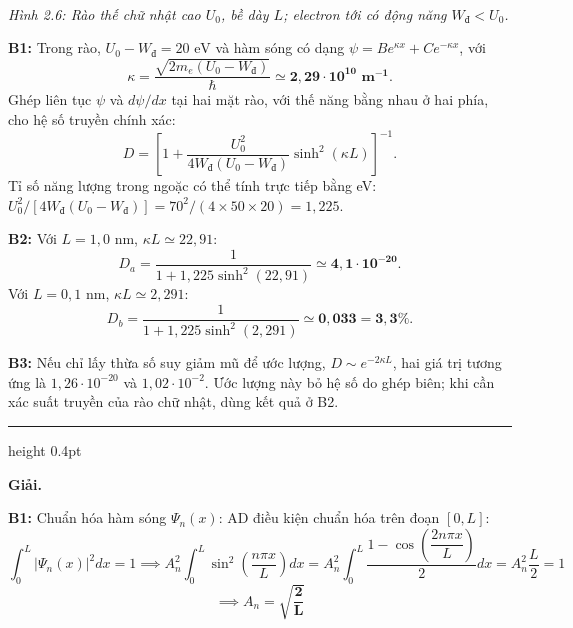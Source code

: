 \documentclass[11pt,a4paper]{article}
\renewcommand{\boldsymbol}[1]{\symbf{#1}}
\let\DeBaiOriginal\DeBai
\renewcommand{\DeBai}[1]{\par\Needspace{5\baselineskip}\DeBaiOriginal{#1}}
\newcommand{\PhanCachBai}{%
  \par\Needspace{7\baselineskip}%
  \addvspace{6pt}%
  {\color{black!40}\hrule height 0.4pt}%
  \nobreak\vspace{7pt}\nobreak
}
\begin{document}
\begin{center}\begin{minipage}{\linewidth}\centering
{}\\[0.1cm]
\textit{Hình 2.6: Rào thế chữ nhật cao $U_0$, bề dày $L$; electron tới có động năng $W_{\text{đ}}<U_0$.}
\end{minipage}\end{center}

\textbf{B1:} Trong rào, $U_0-W_{\text{đ}}=20\text{ eV}$ và hàm sóng có dạng
$\psi=B e^{\kappa x}+C e^{-\kappa x}$, với
\[
\kappa=\frac{\sqrt{2m_e(U_0-W_{\text{đ}})}}{\hbar}
\simeq\boldsymbol{2{,}29\cdot10^{10}\text{ m}^{-1}}.
\]
Ghép liên tục $\psi$ và $d\psi/dx$ tại hai mặt rào, với thế năng bằng nhau ở hai phía,
cho hệ số truyền chính xác:
\[
D=\left[1+\frac{U_0^2}{4W_{\text{đ}}(U_0-W_{\text{đ}})}\sinh^2(\kappa L)\right]^{-1}.
\]
Tỉ số năng lượng trong ngoặc có thể tính trực tiếp bằng eV:
$U_0^2/[4W_{\text{đ}}(U_0-W_{\text{đ}})]=70^2/(4\times50\times20)=1{,}225$.

\textbf{B2:} Với $L=1{,}0\text{ nm}$, $\kappa L\simeq22{,}91$:
\[
D_a=\frac1{1+1{,}225\sinh^2(22{,}91)}
\simeq\boldsymbol{4{,}1\cdot10^{-20}}.
\]
Với $L=0{,}1\text{ nm}$, $\kappa L\simeq2{,}291$:
\[
D_b=\frac1{1+1{,}225\sinh^2(2{,}291)}
\simeq\boldsymbol{0{,}033=3{,}3\%}.
\]

\textbf{B3:} Nếu chỉ lấy thừa số suy giảm mũ để ước lượng,
$D\sim e^{-2\kappa L}$, hai giá trị tương ứng là
$1{,}26\cdot10^{-20}$ và $1{,}02\cdot10^{-2}$.
Ước lượng này bỏ hệ số do ghép biên; khi cần xác suất truyền của rào chữ nhật, dùng kết quả ở B2.

\PhanCachBai


\textbf{Giải.}

\textbf{B1:} Chuẩn hóa hàm sóng $\Psi_n(x)$:
AD điều kiện chuẩn hóa trên đoạn $[0, L]$:
\begin{equation*}
    \int_0^L |\Psi_n(x)|^2 dx = 1 \implies A_n^2 \int_0^L \sin^2\left(\frac{n\pi x}{L}\right) dx = A_n^2 \int_0^L \frac{1 - \cos\left(\dfrac{2n\pi x}{L}\right)}{2} dx = A_n^2 \frac{L}{2} = 1
\end{equation*}
\begin{equation*}
    \implies A_n = \boldsymbol{\sqrt{\frac{2}{L}}}
\end{equation*}
\end{document}
